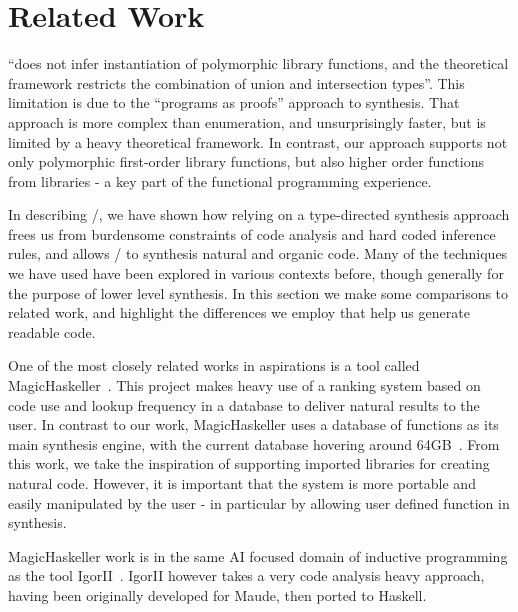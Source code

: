 \section{Related Work}
\label{sec:related}


\cite{Osera:2016} ``does not infer instantiation of polymorphic library functions, and the theoretical framework restricts the combination of union and intersection types''.
This limitation is due to the ``programs as proofs'' approach to synthesis.
That approach is more complex than enumeration, and unsurprisingly faster, but is limited by a heavy theoretical framework.
In contrast, our approach supports not only polymorphic first-order library functions, but also higher order functions from libraries - a key part of the functional programming experience. 

In describing \ourTool/, we have shown how relying on a type-directed synthesis approach frees us from burdensome constraints of code analysis and hard coded inference rules, and allows \ourTool/ to synthesis natural and organic code. Many of the techniques we have used have been explored in various contexts before, though generally for the purpose of lower level synthesis. In this section we make some comparisons to related work, and highlight the differences we employ that help us generate readable code.

One of the most closely related works in aspirations is a tool called MagicHaskeller~\cite{DBLP:conf/aaip/Katayama09}. This project makes heavy use of a ranking system based on code use and lookup frequency in a database to deliver natural results to the user. In contrast to our work, MagicHaskeller uses a database of functions as its main synthesis engine, with the current database hovering around
64GB~\cite{DBLP:conf/agi/Katayama15}. From this work, we take the inspiration of supporting imported libraries for creating natural code. However, it is important that the system is more portable and easily manipulated by the user - in particular by allowing user defined function in synthesis.

MagicHaskeller work is in the same AI focused domain of inductive programming as the tool IgorII~\cite{DBLP:conf/aaip/HofmannKS09}. IgorII however takes a very code analysis heavy approach, having been originally developed for Maude, then ported to Haskell.

